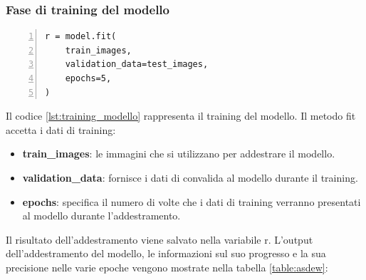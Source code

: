 \documentclass[a4paper,final,12pt]{report}
\begin{document}
\newpage
\subsubsection{Fase di training del modello}
\begin{lstlisting}[caption={Fase di training del modello.}, label={lst:training_modello}, breaklines, escapechar=`\%, frame=lines, basicstyle=\small\ttfamily, keepspaces=true, numbers=left]
r = model.fit(
    train_images,
    validation_data=test_images,
    epochs=5,
)
\end{lstlisting}
Il codice \ref{lst:training_modello} rappresenta il training del modello. Il metodo fit accetta i dati di training:
\begin{itemize}
    \item \textbf{train\_images}:  le immagini che si utilizzano per addestrare il modello.
    \item \textbf{validation\_data}: fornisce i dati di convalida al modello durante il training.
    \item  \textbf{epochs}: specifica il numero di volte che i dati di training verranno presentati al modello durante l'addestramento.
\end{itemize}
Il risultato dell'addestramento viene salvato nella variabile r.
L'output dell'addestramento del modello, le informazioni sul suo progresso e la sua precisione nelle varie epoche vengono mostrate nella tabella \ref{table:asdew}:
\end{document}
